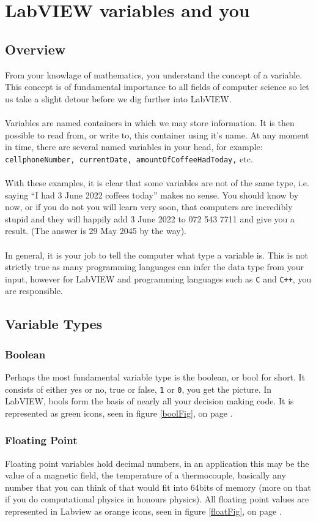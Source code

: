 	\section{LabVIEW variables and you}
	\subsection{Overview}
	From your knowlage of mathematics, you understand the concept of a variable. This concept is of fundamental importance to all fields of computer science so let us take a slight detour before we dig further into LabVIEW.\\
	\\
	Variables are named containers in which we may store information. It is then possible to read from, or write to, this container using it's name. At any moment in time, there are several named variables in your head, for example: \texttt{cellphoneNumber, currentDate, amountOfCoffeeHadToday,} etc.\\
	\\
	With these examples, it is clear that some variables are not of the same type, i.e. saying ``I had 3 June 2022 coffees today'' makes no sense. You should know by now, or if you do not you will learn very soon, that computers are incredibly stupid and they will happily add 3 June 2022 to 072 543 7711 and give you a result. (The answer is 29 May 2045 by the way).\\
	\\
	In general, it is your job to tell the computer what type a variable is. This is not strictly true as many programming languages can infer the data type from your input, however for LabVIEW and programming languages such as \texttt{C} and \texttt{C++}, you are responsible.
	\subsection{Variable Types}
	\subsubsection{Boolean}
	Perhaps the most fundamental variable type is the boolean, or bool for short. It consists of either yes or no, true or false, \texttt{1} or \texttt{0}, you get the picture. In LabVIEW, bools form the basis of nearly all your decision making code. It is represented as green icons, seen in figure \ref{boolFig}, on page \pageref{boolfig}.
	\subsubsection{Floating Point}
	Floating point variables hold decimal numbers, in an application this may be the value of a magnetic field, the temperature of a thermocouple, basically any number that you can think of that would fit into 64bits of memory (more on that if you do computational physics in honours physics). All floating point values are represented in Labview as orange icons, seen in figure \ref{floatFig}, on page \pageref{floatFig}.
